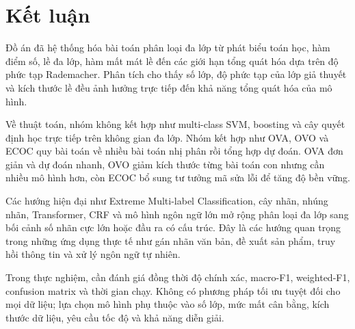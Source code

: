 \section{Kết luận}

Đồ án đã hệ thống hóa bài toán phân loại đa lớp từ phát biểu toán học, hàm điểm số, lề đa lớp, hàm mất mát lề đến các giới hạn tổng quát hóa dựa trên độ phức tạp Rademacher. Phân tích cho thấy số lớp, độ phức tạp của lớp giả thuyết và kích thước lề đều ảnh hưởng trực tiếp đến khả năng tổng quát hóa của mô hình.

Về thuật toán, nhóm không kết hợp như multi-class SVM, boosting và cây quyết định học trực tiếp trên không gian đa lớp. Nhóm kết hợp như OVA, OVO và ECOC quy bài toán về nhiều bài toán nhị phân rồi tổng hợp dự đoán. OVA đơn giản và dự đoán nhanh, OVO giảm kích thước từng bài toán con nhưng cần nhiều mô hình hơn, còn ECOC bổ sung tư tưởng mã sửa lỗi để tăng độ bền vững.

Các hướng hiện đại như Extreme Multi-label Classification, cây nhãn, nhúng nhãn, Transformer, CRF và mô hình ngôn ngữ lớn mở rộng phân loại đa lớp sang bối cảnh số nhãn cực lớn hoặc đầu ra có cấu trúc. Đây là các hướng quan trọng trong những ứng dụng thực tế như gán nhãn văn bản, đề xuất sản phẩm, truy hồi thông tin và xử lý ngôn ngữ tự nhiên.

Trong thực nghiệm, cần đánh giá đồng thời độ chính xác, macro-F1, weighted-F1, confusion matrix và thời gian chạy. Không có phương pháp tối ưu tuyệt đối cho mọi dữ liệu; lựa chọn mô hình phụ thuộc vào số lớp, mức mất cân bằng, kích thước dữ liệu, yêu cầu tốc độ và khả năng diễn giải.